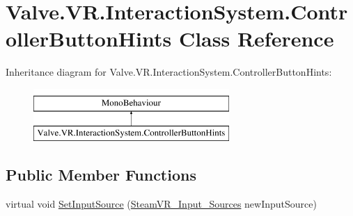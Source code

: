 \hypertarget{class_valve_1_1_v_r_1_1_interaction_system_1_1_controller_button_hints}{}\section{Valve.\+V\+R.\+Interaction\+System.\+Controller\+Button\+Hints Class Reference}
\label{class_valve_1_1_v_r_1_1_interaction_system_1_1_controller_button_hints}
Inheritance diagram for Valve.\+V\+R.\+Interaction\+System.\+Controller\+Button\+Hints\+:\begin{figure}[H]
\begin{center}
\leavevmode
\includegraphics[height=2.000000cm]{class_valve_1_1_v_r_1_1_interaction_system_1_1_controller_button_hints}
\end{center}
\end{figure}
\subsection*{Public Member Functions}
\begin{DoxyCompactItemize}
\item 
virtual void \mbox{\hyperlink{class_valve_1_1_v_r_1_1_interaction_system_1_1_controller_button_hints_a2fe333f357924080487804c3e1281a41}{Set\+Input\+Source}} (\mbox{\hyperlink{namespace_valve_1_1_v_r_a82e5bf501cc3aa155444ee3f0662853f}{Steam\+V\+R\+\_\+\+Input\+\_\+\+Sources}} new\+Input\+Source)
\end{DoxyCompactItemize}
